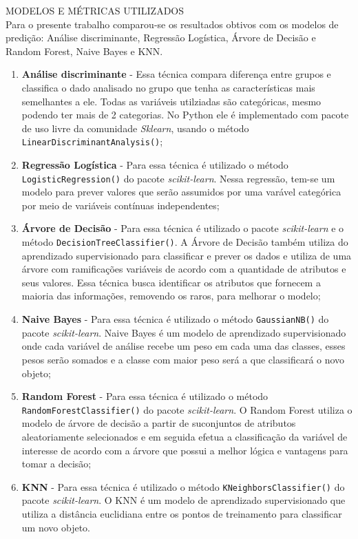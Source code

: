 
\noindent \textcolor{COLOR2}{MODELOS E MÉTRICAS UTILIZADOS}
\\

Para o presente trabalho comparou-se os resultados obtivos com os modelos de predição: Análise discriminante, Regressão Logística, Árvore de Decisão e Random Forest, Naive Bayes e KNN.

\begin{enumerate}
    \item \textbf{Análise discriminante} - Essa técnica compara diferença entre grupos e classifica o dado analisado no grupo que tenha as características mais semelhantes a ele. Todas as variáveis utilziadas são categóricas, mesmo podendo ter mais de 2 categorias. No Python ele é implementado com pacote de uso livre da comunidade \textit{Sklearn}, usando o método \textcolor{COLOR1}{\texttt{LinearDiscriminantAnalysis()}};
    \item \textbf{Regressão Logística} - Para essa técnica é utilizado o método \textcolor{COLOR1}{\texttt{LogisticRegression()}} do pacote \textit{scikit-learn}. Nessa regressão, tem-se um modelo para prever valores que serão assumidos por uma varável categórica por meio de variáveis contínuas independentes;
    \item \textbf{Árvore de Decisão} - Para essa técnica é utilizado o pacote \textit{scikit-learn} e o método \textcolor{COLOR1}{\texttt{DecisionTreeClassifier()}}. A Árvore de Decisão também utiliza do aprendizado supervisionado para classificar e prever os dados e utiliza de uma árvore com ramificações variáveis de acordo com a quantidade de atributos e seus valores. Essa técnica busca identificar os atributos que fornecem a maioria das informações, removendo os raros, para melhorar o modelo;
    \item \textbf{Naive Bayes} - Para essa técnica é utilizado o método \textcolor{COLOR1}{\texttt{GaussianNB()}} do pacote \textit{scikit-learn}. Naive Bayes é um modelo de aprendizado supervisionado onde cada variável de análise recebe um peso em cada uma das classes, esses pesos serão somados e a classe com maior peso será a que classificará o novo objeto;
    \item \textbf{Random Forest} - Para essa técnica é utilizado o método \textcolor{COLOR1}{\texttt{RandomForestClassifier()}} do pacote \textit{scikit-learn}. O Random Forest utiliza o modelo de árvore de decisão a partir de suconjuntos de atributos aleatoriamente selecionados e em seguida efetua a classificação da variável de interesse de acordo com a árvore que possui a melhor lógica e vantagens para tomar a decisão;
    \item \textbf{KNN} - Para essa técnica é utilizado o método \textcolor{COLOR1}{\texttt{KNeighborsClassifier()}} do pacote \textit{scikit-learn}. O KNN é um modelo de aprendizado supervisionado que utiliza a distância euclidiana entre os pontos de treinamento para classificar um novo objeto.
\end{enumerate}


